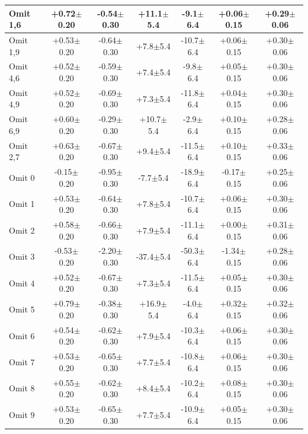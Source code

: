 \begin{landscape}
\begin{table}[!h]
\begin{center}
\begin{tabular}[h]{|l|c|c|c|c|c|c|}
Omit 1,6& \color{blue}+0.72$\pm$0.20& -0.54$\pm$0.30& +11.1$\pm$5.4& -9.1$\pm$6.4& +0.06$\pm$0.15& \color{red}+0.29$\pm$0.06\\\hline
Omit 1,9& +0.53$\pm$0.20& -0.64$\pm$0.30& +7.8$\pm$5.4& -10.7$\pm$6.4& +0.06$\pm$0.15& \color{red}+0.30$\pm$0.06\\\hline
Omit 4,6& +0.52$\pm$0.20& -0.59$\pm$0.30& +7.4$\pm$5.4& -9.8$\pm$6.4& +0.05$\pm$0.15& \color{red}+0.30$\pm$0.06\\\hline
Omit 4,9& +0.52$\pm$0.20& -0.69$\pm$0.30& +7.3$\pm$5.4& -11.8$\pm$6.4& +0.04$\pm$0.15& \color{red}+0.30$\pm$0.06\\\hline
Omit 6,9& \color{blue}+0.60$\pm$0.20& -0.29$\pm$0.30& +10.7$\pm$5.4& -2.9$\pm$6.4& +0.10$\pm$0.15& \color{red}+0.28$\pm$0.06\\\hline
Omit 2,7& \color{blue}+0.63$\pm$0.20& -0.67$\pm$0.30& +9.4$\pm$5.4& -11.5$\pm$6.4& +0.10$\pm$0.15& \color{red}+0.33$\pm$0.06\\\hline
Omit 0& -0.15$\pm$0.20& \color{blue}-0.95$\pm$0.30& -7.7$\pm$5.4& -18.9$\pm$6.4& -0.17$\pm$0.15& \color{red}+0.25$\pm$0.06\\\hline
Omit 1& +0.53$\pm$0.20& -0.64$\pm$0.30& +7.8$\pm$5.4& -10.7$\pm$6.4& +0.06$\pm$0.15& \color{red}+0.30$\pm$0.06\\\hline
Omit 2& +0.58$\pm$0.20& -0.66$\pm$0.30& +7.9$\pm$5.4& -11.1$\pm$6.4& +0.00$\pm$0.15& \color{red}+0.31$\pm$0.06\\\hline
Omit 3& -0.53$\pm$0.20& \color{red}-2.20$\pm$0.30& \color{red}-37.4$\pm$5.4& \color{red}-50.3$\pm$6.4& \color{red}-1.34$\pm$0.15& \color{red}+0.28$\pm$0.06\\\hline
Omit 4& +0.52$\pm$0.20& -0.67$\pm$0.30& +7.3$\pm$5.4& -11.5$\pm$6.4& +0.05$\pm$0.15& \color{red}+0.30$\pm$0.06\\\hline
Omit 5& \color{blue}+0.79$\pm$0.20& -0.38$\pm$0.30& \color{blue}+16.9$\pm$5.4& -4.0$\pm$6.4& +0.32$\pm$0.15& \color{red}+0.32$\pm$0.06\\\hline
Omit 6& +0.54$\pm$0.20& -0.62$\pm$0.30& +7.9$\pm$5.4& -10.3$\pm$6.4& +0.06$\pm$0.15& \color{red}+0.30$\pm$0.06\\\hline
Omit 7& +0.53$\pm$0.20& -0.65$\pm$0.30& +7.7$\pm$5.4& -10.8$\pm$6.4& +0.06$\pm$0.15& \color{red}+0.30$\pm$0.06\\\hline
Omit 8& +0.55$\pm$0.20& -0.62$\pm$0.30& +8.4$\pm$5.4& -10.2$\pm$6.4& +0.08$\pm$0.15& \color{red}+0.30$\pm$0.06\\\hline
Omit 9& +0.53$\pm$0.20& -0.65$\pm$0.30& +7.7$\pm$5.4& -10.9$\pm$6.4& +0.05$\pm$0.15& \color{red}+0.30$\pm$0.06\\\hline
\end{tabular}
\end{center}
\label{tab:run1_residual_correlations_table}
\end{table}


\end{landscape}

